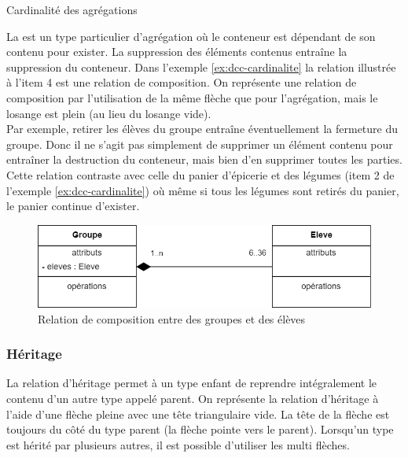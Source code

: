 \begin{exemple}[label = ex:dcc-cardinalite]{Cardinalité des agrégations}
\begin{enumerate}
	\end{enumerate}  
\end{exemple}

La  est un type particulier d'agrégation où le conteneur est dépendant de son contenu pour exister. La suppression des éléments contenus entraîne la suppression du conteneur. Dans l'exemple \ref{ex:dcc-cardinalite} la relation illustrée à l'item 4 est une relation de composition. On représente une relation de composition par l'utilisation de la même flèche que pour l'agrégation, mais le losange est plein (au lieu du losange vide).\\

Par exemple, retirer les élèves du groupe entraîne éventuellement la fermeture du groupe. Donc il ne s'agit pas simplement de supprimer un élément contenu pour entraîner la destruction du conteneur, mais bien d'en supprimer toutes les parties. Cette relation contraste avec celle du panier d'épicerie et des légumes (item 2 de l'exemple \ref{ex:dcc-cardinalite}) où même si tous les légumes sont retirés du panier, le panier continue d'exister.

\begin{figure}[H]
	\caption{Relation de composition entre des groupes et des élèves}
	\centering
	\includegraphics[scale=0.4]{dcc-exemples-composition-1.png}
\end{figure} 

\subsubsection{Héritage}
\label{sssec:heritage}

La relation d'héritage permet à un type enfant de reprendre intégralement le contenu d'un autre type appelé parent. On représente la relation d'héritage à l'aide d'une flèche pleine avec une tête triangulaire vide. La tête de la flèche est toujours du côté du type parent (la flèche pointe vers le parent). Lorsqu'un type est hérité par plusieurs autres, il est possible d'utiliser les multi flèches.

